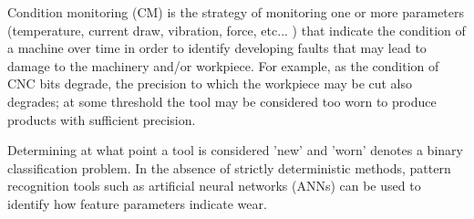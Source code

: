 \documentclass[../main.tex]{subfiles}
\begin{document}

Condition monitoring (CM) is the strategy of monitoring one or more parameters (temperature, current draw, vibration, force,  etc... \cite{citation(s)_needed}) that indicate the condition of a machine over time in order to identify developing faults that may lead to damage to the machinery and/or workpiece. For example, as the condition of CNC bits degrade, the precision to which the workpiece may be cut also degrades; at some threshold the tool may be considered too worn to produce products with sufficient precision.


Determining at what point a tool is considered 'new' and 'worn' denotes a binary classification problem. In the absence of strictly deterministic methods, pattern recognition tools such as artificial neural networks (ANNs) can be used to identify how feature parameters indicate wear.  





\biblio
\end{document}
